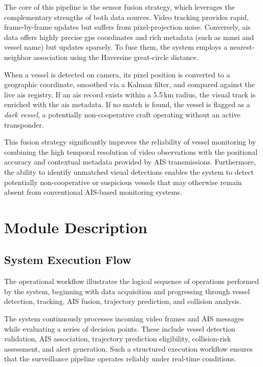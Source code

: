 The core of this pipeline is the sensor fusion strategy, which leverages the complementary strengths of both data sources. Video tracking provides rapid, frame-by-frame updates but suffers from pixel-projection noise. Conversely, \gls{ais} data offers highly precise \gls{gps} coordinates and rich metadata (such as \gls{mmsi} and vessel name) but updates sparsely. To fuse them, the system employs a nearest-neighbor association using the Haversine great-circle distance. 

When a vessel is detected on camera, its pixel position is converted to a geographic coordinate, smoothed via a Kalman filter, and compared against the live \gls{ais} registry. If an \gls{ais} record exists within a 5.5\,km radius, the visual track is enriched with the \gls{ais} metadata. If no match is found, the vessel is flagged as a \textit{dark vessel}, a potentially non-cooperative craft operating without an active transponder.

This fusion strategy significantly improves the reliability of vessel monitoring by combining the high temporal resolution of video observations with the positional accuracy and contextual metadata provided by AIS transmissions. Furthermore, the ability to identify unmatched visual detections enables the system to detect potentially non-cooperative or suspicious vessels that may otherwise remain absent from conventional AIS-based monitoring systems.


\section{Module Description}

\subsection{System Execution Flow}

The operational workflow illustrates the logical sequence of operations performed by the system, beginning with data acquisition and progressing through vessel detection, tracking, AIS fusion, trajectory prediction, and collision analysis.

The system continuously processes incoming video frames and AIS messages while evaluating a series of decision points. These include vessel detection validation, AIS association, trajectory prediction eligibility, collision-risk assessment, and alert generation. Such a structured execution workflow ensures that the surveillance pipeline operates reliably under real-time conditions.

